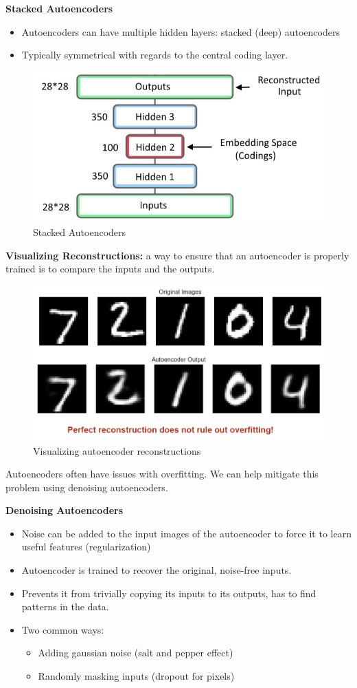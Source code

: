 \textbf{Stacked Autoencoders}
\begin{itemize}
    \item Autoencoders can have multiple hidden layers: stacked (deep) autoencoders
    \item Typically symmetrical with regards to the central coding layer.
\end{itemize}

\begin{figure}[h!t]
    \centering
    \includegraphics[width=0.55\linewidth]{stackedautoencoders.png}
    \caption{Stacked Autoencoders}
    \label{fig:enter-label}
\end{figure}

\textbf{Visualizing Reconstructions:} a way to ensure that an autoencoder is properly trained is to compare the inputs and the outputs.

\begin{figure}[h!t]
    \centering
    \includegraphics[width=0.45\linewidth]{visualizeautoencoder.png}
    \caption{Visualizing autoencoder reconstructions}
    \label{fig:enter-label}
\end{figure}
\newpage

\begin{idea}
    Autoencoders often have issues with overfitting. We can help mitigate this problem using denoising autoencoders.
\end{idea}

\textbf{Denoising Autoencoders}
\begin{itemize}
    \item Noise can be added to the input images of the autoencoder to force it to learn useful features (regularization)
\item Autoencoder is trained to recover the original, noise-free inputs.
\item Prevents it from trivially copying its inputs to its outputs, has to find patterns in the data.
\item Two common ways:
\begin{itemize}
    \item Adding gaussian noise (salt and pepper effect)
    \item Randomly masking inputs (dropout for pixels)
\end{itemize}
\end{itemize}

